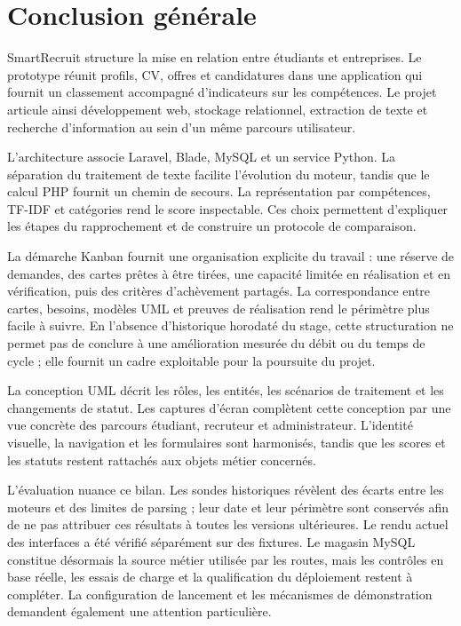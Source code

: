 \chapter*{Conclusion générale}
SmartRecruit structure la mise en relation entre étudiants et entreprises. Le prototype réunit profils, CV, offres et candidatures dans une application qui fournit un classement accompagné d'indicateurs sur les compétences. Le projet articule ainsi développement web, stockage relationnel, extraction de texte et recherche d'information au sein d'un même parcours utilisateur.

L'architecture associe Laravel, Blade, MySQL et un service Python. La séparation du traitement de texte facilite l'évolution du moteur, tandis que le calcul PHP fournit un chemin de secours. La représentation par compétences, TF-IDF et catégories rend le score inspectable. Ces choix permettent d'expliquer les étapes du rapprochement et de construire un protocole de comparaison.

La démarche Kanban fournit une organisation explicite du travail : une réserve de demandes, des cartes prêtes à être tirées, une capacité limitée en réalisation et en vérification, puis des critères d'achèvement partagés. La correspondance entre cartes, besoins, modèles UML et preuves de réalisation rend le périmètre plus facile à suivre. En l'absence d'historique horodaté du stage, cette structuration ne permet pas de conclure à une amélioration mesurée du débit ou du temps de cycle ; elle fournit un cadre exploitable pour la poursuite du projet.

La conception UML décrit les rôles, les entités, les scénarios de traitement et les changements de statut. Les captures d'écran complètent cette conception par une vue concrète des parcours étudiant, recruteur et administrateur. L'identité visuelle, la navigation et les formulaires sont harmonisés, tandis que les scores et les statuts restent rattachés aux objets métier concernés.

L'évaluation nuance ce bilan. Les sondes historiques révèlent des écarts entre les moteurs et des limites de parsing ; leur date et leur périmètre sont conservés afin de ne pas attribuer ces résultats à toutes les versions ultérieures. Le rendu actuel des interfaces a été vérifié séparément sur des fixtures. Le magasin MySQL constitue désormais la source métier utilisée par les routes, mais les contrôles en base réelle, les essais de charge et la qualification du déploiement restent à compléter. La configuration de lancement et les mécanismes de démonstration demandent également une attention particulière.

